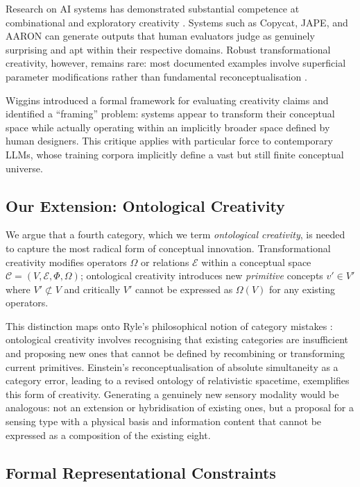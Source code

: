 \documentclass[pdflatex,sn-mathphys-num]{sn-jnl}
\begin{document}
Research on AI systems has demonstrated substantial competence at combinational and
exploratory creativity \cite{hofstadter1995fluid,cope1996experiments}.  Systems such as
Copycat, JAPE, and AARON can generate outputs that human evaluators judge as genuinely
surprising and apt within their respective domains.  Robust transformational creativity,
however, remains rare: most documented examples involve superficial parameter modifications
rather than fundamental reconceptualisation \cite{boden2004creative}.

Wiggins \cite{wiggins2006preliminary} introduced a formal framework for evaluating creativity
claims and identified a ``framing'' problem: systems appear to transform their conceptual space
while actually operating within an implicitly broader space defined by human designers.  This
critique applies with particular force to contemporary LLMs, whose training corpora implicitly
define a vast but still finite conceptual universe.

\subsection{Our Extension: Ontological Creativity}

We argue that a fourth category, which we term \emph{ontological creativity}, is needed to
capture the most radical form of conceptual innovation.  Transformational creativity modifies
operators $\Omega$ or relations $\mathcal{E}$ within a conceptual space $\mathcal{C} = (V,
\mathcal{E}, \Phi, \Omega)$; ontological creativity introduces new \emph{primitive} concepts
$v' \in V'$ where $V' \not\subset V$ and critically $V'$ cannot be expressed as
$\Omega(V)$ for any existing operators.

This distinction maps onto Ryle's philosophical notion of category mistakes
\cite{ryle1949concept}: ontological creativity involves recognising that existing categories
are insufficient and proposing new ones that cannot be defined by recombining or transforming
current primitives.  Einstein's reconceptualisation of absolute simultaneity as a category
error, leading to a revised ontology of relativistic spacetime, exemplifies this form of
creativity.  Generating a genuinely new sensory modality would be analogous: not an extension
or hybridisation of existing ones, but a proposal for a sensing type with a physical basis and
information content that cannot be expressed as a composition of the existing eight.

\subsection{Formal Representational Constraints}
\end{document}
